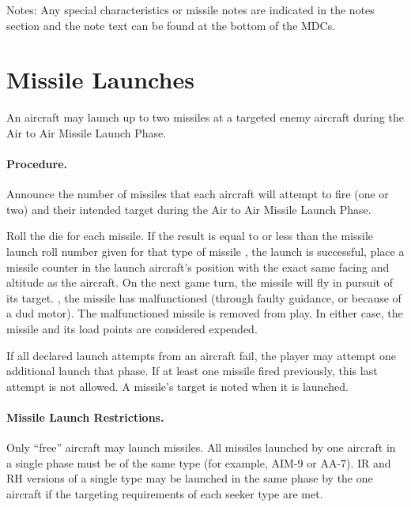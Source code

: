 Notes: Any special characteristics or missile notes are indicated in the notes section and the note text can be found at the bottom of the MDCs.

\section{Missile Launches}
\label{rule:missile-launches}

An aircraft may launch up to two missiles at a targeted enemy aircraft during the Air to Air Missile Launch Phase.



\paragraph{Procedure.} 
Announce the number of missiles that each aircraft will attempt to fire (one or two) and their intended target during the Air to Air Missile Launch Phase.

Roll the die for each missile. If the result is equal to or less than the missile launch roll number given for that type of missile , the launch is successful, place a missile counter in the launch aircraft's position with the exact same facing and altitude as the aircraft. On the next game turn, the missile will fly in pursuit of its target. , the missile has malfunctioned (through faulty guidance, or because of a dud motor). The malfunctioned missile is removed from play. In either case, the missile and its load points are considered expended. 

If all declared launch attempts from an aircraft fail, the player may attempt one additional launch that phase. If at least one missile fired previously, this last attempt is not allowed. A missile's target is noted when it is launched.

\paragraph{Missile Launch Restrictions.} Only “free” aircraft may launch missiles. All missiles launched by one aircraft in a single phase must be of the same type (for example, AIM-9 or AA-7). IR and RH versions of a single type may be launched in the same phase by the one aircraft if the targeting requirements of each seeker type are met.

